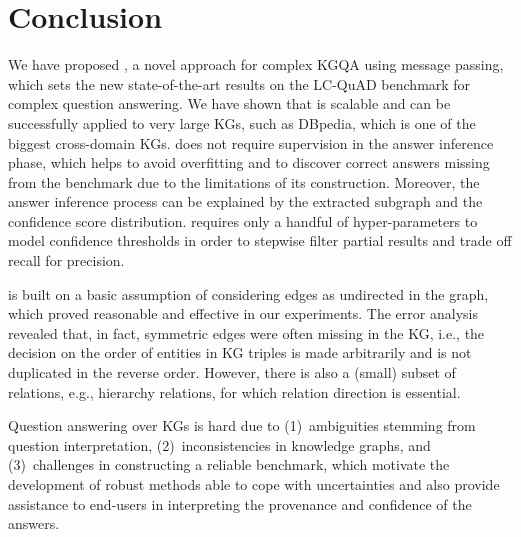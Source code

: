 \section{Conclusion}
\label{sec:conclusion}

We have proposed \OurApproach{}, a novel approach for complex KGQA using message passing, which sets the new state-of-the-art results on the LC-QuAD benchmark for complex question answering.
We have shown that \OurApproach{} is scalable and can be successfully applied to very large KGs, such as DBpedia, which is one of the biggest cross-domain KGs.
\OurApproach{} does not require supervision in the answer inference phase, which helps to avoid overfitting and to discover correct answers missing from the benchmark due to the limitations of its construction.
Moreover, the answer inference process can be explained by the extracted subgraph and the confidence score distribution.
\OurApproach{} requires only a handful of hyper-parameters to model confidence thresholds in order to stepwise filter partial results and trade off recall for precision.

\OurApproach{} is built on a basic assumption of considering edges as undirected in the graph, which proved reasonable and effective in our experiments.
The error analysis revealed that, in fact, symmetric edges were often missing in the KG, i.e., the decision on the order of entities in KG triples is made arbitrarily and is not duplicated in the reverse order.
However, there is also a (small) subset of relations, e.g., hierarchy relations, for which relation direction is essential.

Question answering over KGs is hard due to (1)~ambiguities stemming from question interpretation, (2)~inconsistencies in knowledge graphs, and (3)~challenges in constructing a reliable benchmark, which motivate the development of robust methods able to cope with uncertainties and also provide assistance to end-users in interpreting the provenance and confidence of the answers.

